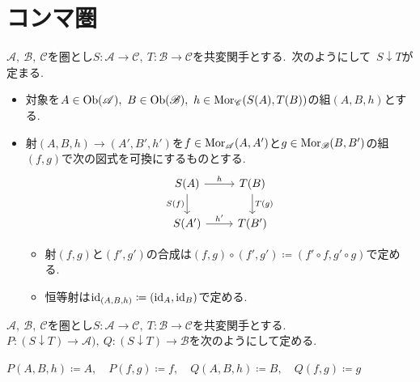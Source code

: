 
\section{コンマ圏}

\begin{definition}
$\mathscr{A},\ \mathscr{B},\ \mathscr{C}$を圏とし$S \colon \mathscr{A} \to \mathscr{C},\ T \colon \mathscr{B} \to \mathscr{C}$を共変関手とする.\
次のようにして\ $S \downarrow T$が定まる.
\begin{itemize}
	\item 対象を$A \in \operatorname{Ob}(\mathscr{A}),\ B \in \operatorname{Ob}(\mathscr{B}),\ h \in \operatorname{Mor}_{\mathscr{C}}(S(A), T(B))$の組$(A, B, h)$とする.
	\item 射$(A, B, h) \to (A', B', h')$を$f \in \operatorname{Mor}_{\mathscr{A}}(A, A')$と$g \in \operatorname{Mor}_{\mathscr{B}}(B, B')$の組$(f, g)$で次の図式を可換にするものとする.
\[\begin{tikzcd}
	{S(A)} & {T(B)} \\
	{S(A')} & {T(B')}
	\arrow["h", from=1-1, to=1-2]
	\arrow["{S(f)}"', from=1-1, to=2-1]
	\arrow["{T(g)}", from=1-2, to=2-2]
	\arrow["{h'}", from=2-1, to=2-2]
\end{tikzcd}\]
	\begin{itemize}
		\item 射$(f,g)$と$(f',g')$の合成は$(f,g) \circ (f',g') \coloneq (f' \circ f, g' \circ g)$で定める.
		\item 恒等射は$\operatorname{id}_{(A,B,h)} \coloneq (\operatorname{id}_{A}, \operatorname{id}_{B})$で定める.
	\end{itemize}
\end{itemize}
\end{definition}

\begin{definition}
$\mathscr{A},\ \mathscr{B},\ \mathscr{C}$を圏とし$S \colon \mathscr{A} \to \mathscr{C},\ T \colon \mathscr{B} \to \mathscr{C}$を共変関手とする.\
\ $P \colon (S \downarrow T) \to \mathscr{A}),\ Q \colon (S \downarrow T) \to \mathscr{B}$を次のようにして定める.
\begin{center}
$P(A,B,h) \coloneq A,\quad P(f,g) \coloneq f,\quad Q(A,B,h) \coloneq B,\quad Q(f,g) \coloneq g$
\end{center}
\end{definition}

